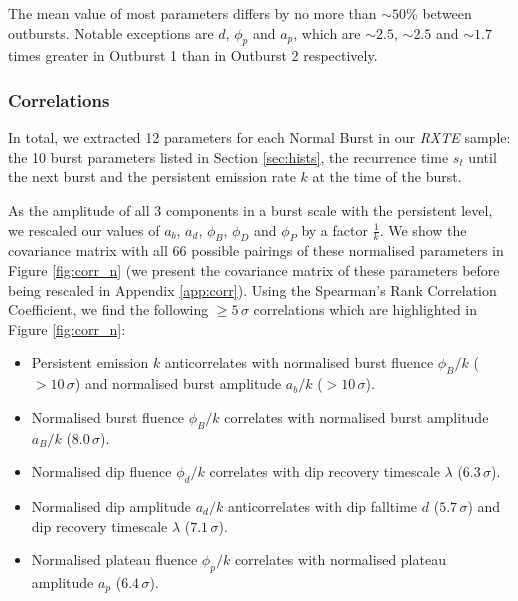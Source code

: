 \par The mean value of most parameters differs by no more than $\sim50$\% between outbursts.  Notable exceptions are $d$, $\phi_p$ and $a_p$, which are $\sim2.5$, $\sim2.5$ and $\sim1.7$ times greater in Outburst 1 than in Outburst 2 respectively.

\subsubsection{Correlations}

\label{sec:NormCorr}

\par In total, we extracted 12 parameters for each Normal Burst in our \textit{RXTE} sample: the 10 burst parameters listed in Section \ref{sec:hists}, the recurrence time $s_t$ until the next burst and the persistent emission rate $k$ at the time of the burst.  %
\par As the amplitude of all 3 components in a burst scale with the persistent level, we rescaled our values of $a_b$, $a_d$, $\phi_B$, $\phi_D$ and $\phi_P$ by a factor $\frac{1}{k}$.  We show the covariance matrix with all 66 possible pairings of these normalised parameters in Figure \ref{fig:corr_n} (we present the covariance matrix of these parameters before being rescaled in Appendix \ref{app:corr}).  Using the Spearman's Rank Correlation Coefficient, we find the following $\geq5\,\sigma$ correlations which are highlighted in Figure \ref{fig:corr_n}:

\begin{itemize}
\item Persistent emission $k$ anticorrelates with normalised burst fluence $\phi_B/k$ ($>10\,\sigma$) and normalised burst amplitude $a_b/k$ ($>10\,\sigma$).
\item Normalised burst fluence $\phi_B/k$ correlates with normalised burst amplitude $a_B/k$ ($8.0\,\sigma$).
\item Normalised dip fluence $\phi_d/k$ correlates with dip recovery timescale $\lambda$ ($6.3\,\sigma$).
\item Normalised dip amplitude $a_d/k$ anticorrelates with dip falltime $d$ ($5.7\,\sigma$) and dip recovery timescale $\lambda$ ($7.1\,\sigma$).
\item Normalised plateau fluence $\phi_p/k$ correlates with normalised plateau amplitude $a_p$ ($6.4\,\sigma$).
\end{itemize}


